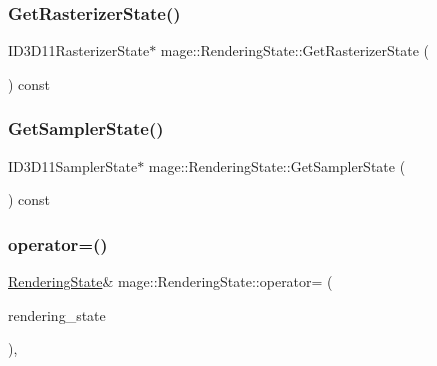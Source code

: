 \hypertarget{structmage_1_1_rendering_state_ac7d1a6360ebd65b9345f9f4e38262fe7}{}\label{structmage_1_1_rendering_state_ac7d1a6360ebd65b9345f9f4e38262fe7} 
\subsubsection{\texorpdfstring{Get\+Rasterizer\+State()}{GetRasterizerState()}}
{\footnotesize\ttfamily I\+D3\+D11\+Rasterizer\+State$\ast$ mage\+::\+Rendering\+State\+::\+Get\+Rasterizer\+State (\begin{DoxyParamCaption}{ }\end{DoxyParamCaption}) const}

\hypertarget{structmage_1_1_rendering_state_a251773f942157b07a7d3272e5e3c8a2e}{}\label{structmage_1_1_rendering_state_a251773f942157b07a7d3272e5e3c8a2e} 
\subsubsection{\texorpdfstring{Get\+Sampler\+State()}{GetSamplerState()}}
{\footnotesize\ttfamily I\+D3\+D11\+Sampler\+State$\ast$ mage\+::\+Rendering\+State\+::\+Get\+Sampler\+State (\begin{DoxyParamCaption}{ }\end{DoxyParamCaption}) const}

\hypertarget{structmage_1_1_rendering_state_af03ad38dd9b88949fc9d3603e4829c26}{}\label{structmage_1_1_rendering_state_af03ad38dd9b88949fc9d3603e4829c26} 
\subsubsection{\texorpdfstring{operator=()}{operator=()}\hspace{0.1cm}{\footnotesize\ttfamily [1/2]}}
{\footnotesize\ttfamily \hyperlink{structmage_1_1_rendering_state}{Rendering\+State}\& mage\+::\+Rendering\+State\+::operator= (\begin{DoxyParamCaption}\item[{const \hyperlink{structmage_1_1_rendering_state}{Rendering\+State} \&}]{rendering\+\_\+state }\end{DoxyParamCaption})\hspace{0.3cm}{\ttfamily [private]}, {\ttfamily [delete]}}


